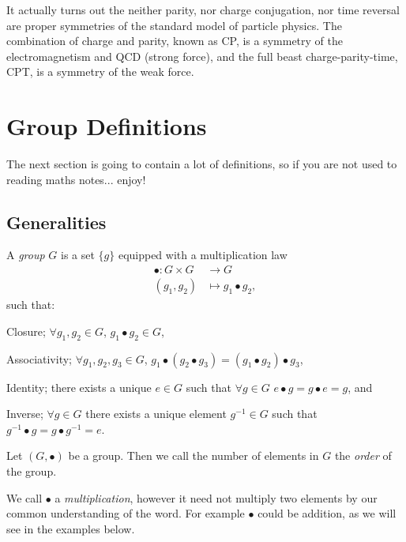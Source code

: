\br 
    It actually turns out the neither parity, nor charge conjugation, nor time reversal are proper symmetries of the standard model of particle physics. The combination of charge and parity, known as CP, is a symmetry of the electromagnetism and QCD (strong force), and the full beast charge-parity-time, CPT, is a symmetry of the weak force. 
\er 

\section{Group Definitions}

The next section is going to contain a lot of definitions, so if you are not used to reading maths notes... enjoy!

\subsection{Generalities}

\bd[Group] 
    A \textit{group} $G$ is a set $\{g\}$ equipped with a multiplication law 
    \begin{equation*}
        \begin{split}
            \bullet : G \times G & \to G \\
            (g_1,g_2) & \mapsto g_1\bullet g_2,
        \end{split}
    \end{equation*}
    such that:
    \ben[label=(\roman*)]
        \item Closure; $\forall g_1,g_2\in G$, $g_1\bullet g_2 \in G$,
        \item Associativity; $\forall g_1,g_2,g_3\in G$, $g_1\bullet(g_2\bullet g_3) = (g_1\bullet g_2)\bullet g_3$,
        \item Identity; there exists a unique $e\in G$ such that $\forall g \in G$ $e\bullet g = g\bullet e =g$, and 
        \item Inverse; $\forall g \in G$ there exists a unique element $g^{-1}\in G$ such that $g^{-1}\bullet g = g \bullet g^{-1} = e$.
    \een
\ed 

    Let $(G,\bullet)$ be a group. Then we call the number of elements in $G$ the \textit{order} of the group. 
\ed 

\br 
    We call $\bullet$ a \textit{multiplication}, however it need not multiply two elements by our common understanding of the word. For example $\bullet$ could be addition, as we will see in the examples below. 
\er 

